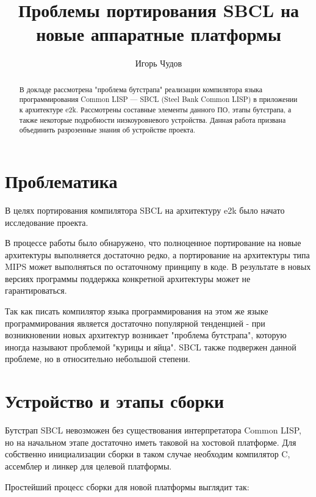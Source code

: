 \author{Игорь Чудов}
\title{Проблемы портирования SBCL на новые аппаратные платформы}
\maketitle

\begin{abstract}
  В докладе рассмотрена "проблема бутстрапа" реализации компилятора
  языка программирования Common LISP --- SBCL (Steel Bank Common LISP)
  в приложении к архитектуре e2k. Рассмотрены составные элементы данного
  ПО, этапы бутстрапа, а также некоторые подробности низкоуровневого
  устройства. Данная работа призвана объединить разрозенные знания об
  устройстве проекта.
\end{abstract}


\section{Проблематика}

В целях портирования компилятора SBCL на архитектуру e2k было начато
исследование проекта.

В процессе работы было обнаружено, что полноценное портирование на новые
архитектуры выполняется достаточно редко, а портирование на архитектуры
типа MIPS может выполняться по остаточному принципу в коде. В результате
в новых версиях программы поддержка конкретной архитектуры может не
гарантироваться.

Так как писать компилятор языка программирования на этом же языке
программирования является достаточно популярной тенденцией - при
возникновении новых архитектур возникает "проблема бутстрапа", которую
иногда называют проблемой "курицы и яйца". SBCL также подвержен данной
проблеме, но в относительно небольшой степени.


\section{Устройство и этапы сборки}

Бутстрап SBCL невозможен без существования интерпретатора Common LISP,
но на начальном этапе достаточно иметь таковой на хостовой платформе.
Для собственно инициализации сборки в таком случае необходим компилятор
C, ассемблер и линкер для целевой платформы.

Простейший процесс сборки для новой платформы выглядит так:

